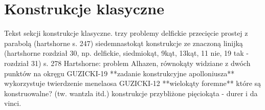 %

\section{Konstrukcje klasyczne}
Tekst sekcji konstrukcje klasyczne.
trzy problemy delfickie
przecięcie prostej z parabolą (hartshorne s. 247)
siedemnastokąt
konstrukcje ze znaczoną linijką (hartshorne rozdział 30, np. delfickie, siedmiokąt, 9kąt, 13kąt, 11 nie, 19 tak - rozdział 31)
s. 278 Hartshorne: problem Alhazen, równokąty widziane z dwóch punktów na okręgu
GUZICKI-19 **zadanie konstrukcyjne apolloniusza** wykorzystuje twierdzenie menelaosa
GUZICKI-12 **wielokąty foremne** które są konstruowalne? (tw. wantzla itd.) konstrukcje przybliżone pięciokąta - durer i da vinci.








%